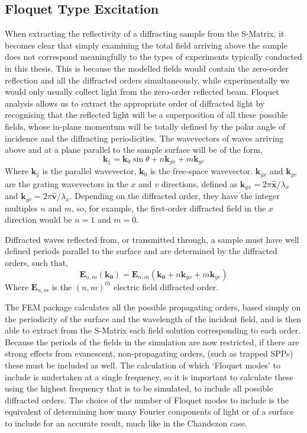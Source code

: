 \subsection{Floquet Type Excitation}
When extracting the reflectivity of a diffracting sample from the S-Matrix, it becomes clear that simply examining the total field arriving above the sample does not correspond meaningfully to the types of experiments typically conducted in this thesis. This is because the modelled fields would contain the zero-order reflection and all the diffracted orders simultaneously, while experimentally we would only usually collect light from the zero-order reflected beam. Floquet analysis allows us to extract the appropriate order of diffracted light by recognising that the reflected light will be a superposition of all these possible fields, whose in-plane momentum will be totally defined by the polar angle of incidence and the diffracting periodicities. The wavevectors of waves arriving above and at a plane parallel to the sample surface will be of the form,
\begin{equation}
\mathbf{k}_{\parallel}=\mathbf{k}_0\sin{\theta}+n\mathbf{k}_{gx}+m\mathbf{k}_{gv}
\end{equation}
Where $\mathbf{k}_{\parallel}$ is the parallel wavevector, $\mathbf{k}_0$ is the free-space wavevector. $\mathbf{k}_{gx}$ and $\mathbf{k}_{gv}$ are the grating wavevectors in the $x$ and $v$ directions, defined as $\mathbf{k}_{gx}=2\pi\hat{\mathbf{x}}/\lambda_x$ and $\mathbf{k}_{gv}=2\pi\hat{\mathbf{v}}/\lambda_x$. Depending on the diffracted order, they have the integer multiples $n$ and $m$, so, for example, the first-order diffracted field in the $x$ direction would be $n=1$ and $m=0$. 

Diffracted waves reflected from, or transmitted through, a sample must have well defined periods parallel to the surface and are determined by the diffracted orders, such that,
\begin{equation}
\mathbf{E}_{n,m}(\mathbf{k_0})=\mathbf{E}_{n,m}(\mathbf{k_0}+n\mathbf{k}_{gx}+m\mathbf{k}_{gv})
\end{equation}
Where $\mathbf{E}_{n,m}$ is the $(n,m)^{th}$ electric field diffracted order. 

The FEM package calculates all the possible propagating orders, based simply on the periodicity of the surface and the wavelength of the incident field, and is then able to extract from the S-Matrix each field solution corresponding to each order. Because the periods of the fields in the simulation are now restricted, if there are strong effects from evanescent, non-propagating orders, (such as trapped SPPs) these must be included as well. The calculation of which `Floquet modes' to include is undertaken at a single frequency, so it is important to calculate these using the highest frequency that is to be simulated, to include all possible diffracted orders.
The choice of the number of Floquet modes to include is the equivalent of determining how many Fourier components of light or of a surface to include for an accurate result, much like in the Chandezon case.








